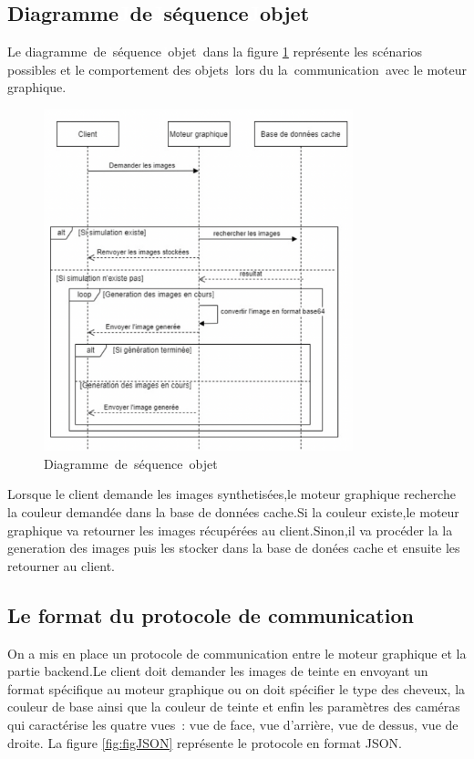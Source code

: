\newpage
\subsection{Diagramme\textcolor{white}{J}de\textcolor{white}{J}séquence\textcolor{white}{J}objet}
Le diagramme\textcolor{white}{J}de\textcolor{white}{J}séquence\textcolor{white}{J}objet\textcolor{white}{J}dans la figure \ref{fig:seqobj} représente les scénarios possibles et le comportement des objets\textcolor{white}{J}lors du la\textcolor{white}{J}communication\textcolor{white}{J}avec le moteur graphique.
\begin{figure}[!ht]
\includegraphics[width=0.8\textwidth,angle=00]{chapitres/chapitre3/figures/DiagSeqObj.png}
\caption{Diagramme\textcolor{white}{J}de\textcolor{white}{J}séquence\textcolor{white}{J}objet}
\label{fig:seqobj}
\end{figure}

Lorsque le client demande les images synthetisées,le moteur graphique recherche la couleur demandée dans la base de données cache.Si la couleur existe,le moteur graphique va retourner les images récupérées au client.Sinon,il va procéder la la generation des images puis les stocker dans la base de donées cache et ensuite les retourner au client.

\newpage
\subsection{Le format du protocole de communication}
On a mis en place un protocole de communication entre le moteur graphique et la partie backend.Le client doit demander les images de teinte en envoyant un format spécifique au moteur graphique ou on doit spécifier le type des cheveux, la couleur de base ainsi que la couleur de teinte et enfin les paramètres des caméras qui caractérise les quatre vues : vue de face, vue d’arrière, vue de dessus, vue de droite. 
La figure \ref{fig:figJSON} représente le protocole en format JSON.

